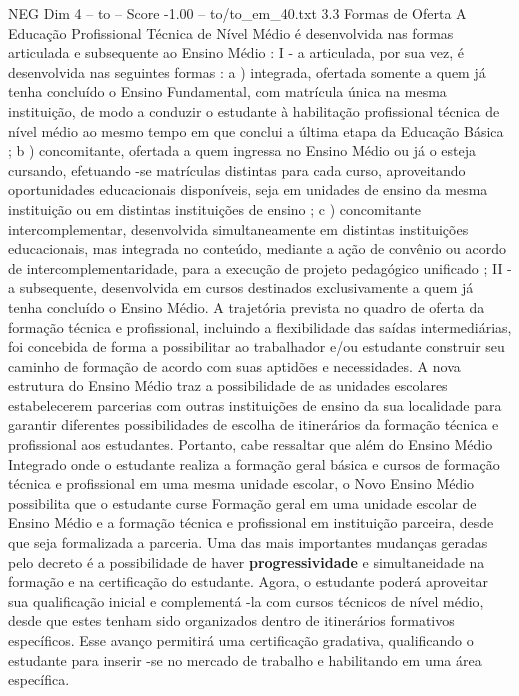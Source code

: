 \begin{textsample}{NEG Dim 4 – to – Score -1.00 – to/to\_em\_40.txt}  \label{ex:f4_neg_087}
3.3 Formas de Oferta A Educação Profissional Técnica de Nível Médio é desenvolvida nas formas articulada e subsequente ao Ensino Médio : I - a articulada, por sua vez, é desenvolvida nas seguintes formas : a ) integrada, ofertada somente a quem já tenha concluído o Ensino Fundamental, com matrícula única na mesma instituição, de modo a conduzir o estudante à habilitação profissional técnica de nível médio ao mesmo tempo em que conclui a última etapa da Educação Básica ; b ) concomitante, ofertada a quem ingressa no Ensino Médio ou já o esteja cursando, efetuando -se matrículas distintas para cada curso, aproveitando oportunidades educacionais disponíveis, seja em unidades de ensino da mesma instituição ou em distintas instituições de ensino ; c ) concomitante intercomplementar, desenvolvida simultaneamente em distintas instituições educacionais, mas integrada no conteúdo, mediante a ação de convênio ou acordo de intercomplementaridade, para a execução de projeto pedagógico unificado ; II - a subsequente, desenvolvida em cursos destinados exclusivamente a quem já tenha concluído o Ensino Médio.
A trajetória prevista no quadro de oferta da formação técnica e profissional, incluindo a flexibilidade das saídas intermediárias, foi concebida de forma a possibilitar ao trabalhador e/ou estudante construir seu caminho de formação de acordo com suas aptidões e necessidades.
A nova estrutura do Ensino Médio traz a possibilidade de as unidades escolares estabelecerem parcerias com outras instituições de ensino da sua localidade para garantir diferentes possibilidades de escolha de itinerários da formação técnica e profissional aos estudantes.
Portanto, cabe ressaltar que além do Ensino Médio Integrado onde o estudante realiza a formação geral básica e cursos de formação técnica e profissional em uma mesma unidade escolar, o Novo Ensino Médio possibilita que o estudante curse Formação geral em uma unidade escolar de Ensino Médio e a formação técnica e profissional em instituição parceira, desde que seja formalizada a parceria.
Uma das mais importantes mudanças geradas pelo decreto é a possibilidade de haver \textbf{progressividade} e simultaneidade na formação e na certificação do estudante.
Agora, o estudante poderá aproveitar sua qualificação inicial e complementá -la com cursos técnicos de nível médio, desde que estes tenham sido organizados dentro de itinerários formativos específicos.
Esse avanço permitirá uma certificação gradativa, qualificando o estudante para inserir -se no mercado de trabalho e habilitando em uma área específica.

\end{textsample}

